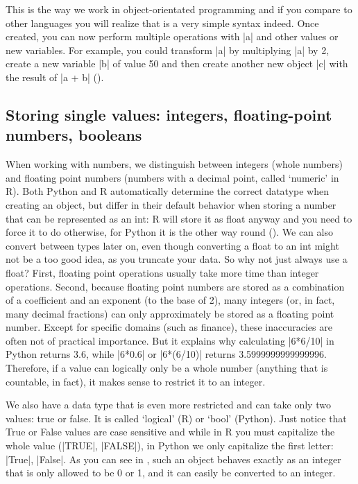 This is the way we work in object-orientated programming and if you
compare to other languages you will realize that is a very simple
syntax indeed. Once created, you can now perform multiple operations
with |a| and other values or new variables. For example, you
could transform |a| by multiplying |a| by 2, create a new
variable |b| of value 50 and then create another new object
|c| with the result of |a + b| ().





\subsection{Storing single values: integers, floating-point numbers, booleans}

When working with numbers, we distinguish between integers (whole
numbers) and floating point numbers (numbers with a decimal point,
called `numeric' in R). Both Python and R automatically determine the
correct datatype when creating an object, but differ in their default
behavior when storing a number that can be represented as an int: R
will store it as float anyway and you need to force it to do
otherwise, for Python it is the other way round
(). We can also convert between types later on,
even though converting a float to an int might not be a too good idea,
as you truncate your data. So why not just always use a float? First,
floating point operations usually take more time than integer operations.
Second, because floating point numbers are stored as a combination of
a coefficient and an exponent (to the base of 2), many integers (or,
in fact, many decimal fractions) can only approximately be stored
as a floating point number. Except for specific domains (such
as finance), these inaccuracies are often not of practical importance.
But it explains why calculating |6*6/10| in Python returns 3.6, while
|6*0.6| or |6*(6/10)| returns 3.5999999999999996. Therefore, if
a value can logically only be a whole number (anything that is
countable, in fact), it makes sense to restrict it to an integer.

We also have a data type that is even more restricted and can take
only two values: true or false. It is called `logical' (R) or `bool'
(Python).  Just notice that True or False values are case sensitive
and while in R you must capitalize the whole value (|TRUE|, |FALSE|), in
Python we only capitalize the first letter: |True|, |False|.  As you can
see in , such an object behaves exactly as an integer that
is only allowed to be 0 or 1, and it can easily be converted to an
integer.

